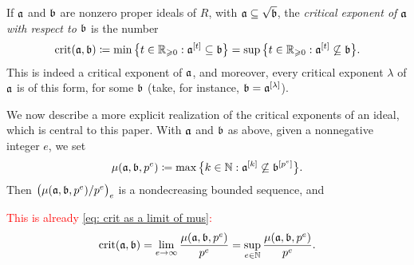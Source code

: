 \documentclass{amsart}
\begin{document}
{If $\mathfrak{a}$ and $\mathfrak{b}$ are nonzero proper ideals of $R$, with $\mathfrak{a} \subseteq \sqrt{\mathfrak{b}}$, the \emph{critical exponent of $\mathfrak{a}$ with respect to $\mathfrak{b}$} is the number
\begin{equation}\label{eq: defn of crit(a,b)}
   \operatorname{crit}(\mathfrak{a},\mathfrak{b}) \coloneqq \min\big\{t\in \mathbb{R}_{\geqslant 0}: \mathfrak{a}^{[t]} \subseteq \mathfrak{b}\big\}
      = \sup\big\{t\in \mathbb{R}_{\geqslant 0}: \mathfrak{a}^{[t]} \not\subseteq \mathfrak{b}\big\}.
\end{equation}
This is indeed a critical exponent of $\mathfrak{a}$, and moreover, every critical exponent $\lambda$ of $\mathfrak{a}$ is of this form, for some $\mathfrak{b}$ (take, for instance, $\mathfrak{b} = \mathfrak{a}^{[\lambda]}$).

We now describe a more explicit realization of the critical exponents of an ideal, which is central to this paper.
With $\mathfrak{a}$ and $\mathfrak{b}$ as above, given a nonnegative integer $e$, we set
\[\mu(\mathfrak{a},\mathfrak{b},p^e) \coloneqq \max\big\{k\in \mathbb{N} : \mathfrak{a}^{[k]} \not\subseteq \mathfrak{b}^{[p^e]}\big\}.\]
Then $\big(\mu(\mathfrak{a},\mathfrak{b},p^e)/p^e\big)_e$ is a nondecreasing bounded sequence, and

\textcolor{red}{This is already \eqref{eq: crit as a limit of mus}:
}
\begin{equation}
   \operatorname{crit}(\mathfrak{a},\mathfrak{b}) = \lim_{e\to \infty} \frac{\mu(\mathfrak{a},\mathfrak{b},p^e)}{p^e} = \sup_{e\in \mathbb{N}} \frac{\mu(\mathfrak{a},\mathfrak{b},p^e)}{p^e}.
\end{equation}



}
\end{document}
